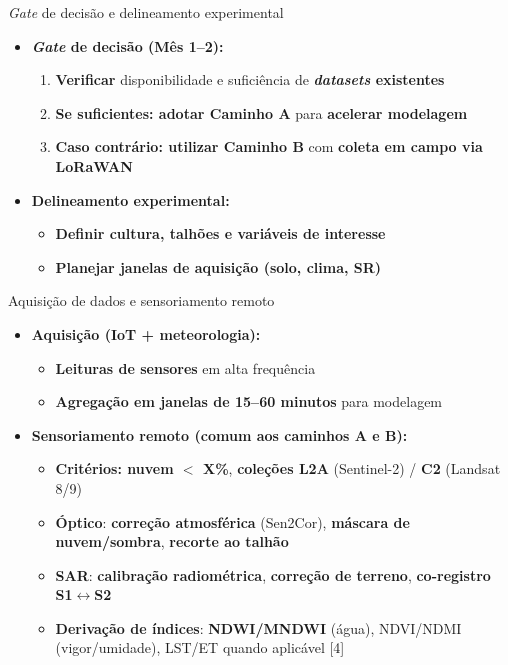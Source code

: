 \documentclass[aspectratio=169]{beamer}
\begin{document}
\begin{frame}{\emph{Gate} de decisão e delineamento experimental}
  \begin{itemize}
    \item \textbf{\emph{Gate} de decisão (Mês 1--2):}
      \begin{enumerate}
        \item \textbf{Verificar} disponibilidade e suficiência de \textbf{\emph{datasets} existentes}
        \item \textbf{Se suficientes: adotar Caminho A} para \textbf{acelerar modelagem}
        \item \textbf{Caso contrário: utilizar Caminho B} com \textbf{coleta em campo via LoRaWAN}
      \end{enumerate}
    \item \textbf{Delineamento experimental:}
      \begin{itemize}
        \item \textbf{Definir cultura, talhões e variáveis de interesse}
        \item \textbf{Planejar janelas de aquisição (solo, clima, SR)}
      \end{itemize}
  \end{itemize}
\end{frame}

\begin{frame}{Aquisição de dados e sensoriamento remoto}
  \begin{itemize}
    \item \textbf{Aquisição (IoT + meteorologia):}
      \begin{itemize}
        \item \textbf{Leituras de sensores} em alta frequência
        \item \textbf{Agregação em janelas de 15--60 minutos} para modelagem
      \end{itemize}
    \item \textbf{Sensoriamento remoto (comum aos caminhos A e B):}
      \begin{itemize}
        \item \textbf{Critérios: nuvem $<$ X\%}, \textbf{coleções L2A} (Sentinel-2) / \textbf{C2} (Landsat 8/9)
        \item \textbf{Óptico}: \textbf{correção atmosférica} (Sen2Cor), \textbf{máscara de nuvem/sombra}, \textbf{recorte ao talhão}
        \item \textbf{SAR}: \textbf{calibração radiométrica}, \textbf{correção de terreno}, \textbf{co-registro S1$\leftrightarrow$S2}
        \item \textbf{Derivação de índices}: \textbf{NDWI/MNDWI} (água), NDVI/NDMI (vigor/umidade), LST/ET quando aplicável [4]
      \end{itemize}
  \end{itemize}
\end{frame}
\end{document}
